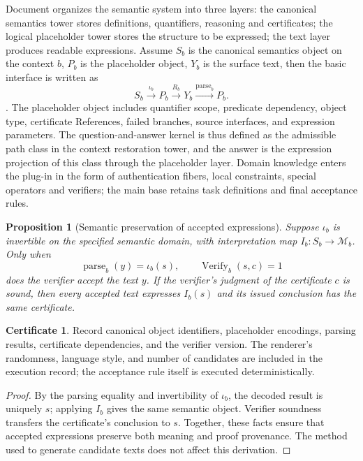 \documentclass[11pt,a4paper]{article}
\theoremstyle{plain}
\newtheorem{proposition}[theorem]{Proposition}
\theoremstyle{definition}
\newtheorem*{certificate}{Certificate}
\theoremstyle{remark}
\begin{document}
\begin{CJK*}
Document \cite{S20} organizes the semantic system into three layers: the canonical semantics tower stores definitions, quantifiers, reasoning and certificates; the logical placeholder tower stores the structure to be expressed; the text layer produces readable expressions. Assume $S_b$ is the canonical semantics object on the context $b$, $P_b$ is the placeholder object, $Y_b$ is the surface text, then the basic interface is written as \[
 S_b\xrightarrow{\iota_b}P_b\xrightarrow{R_b}Y_b
 \xrightarrow{\operatorname{parse}_b}P_b.
\]. The placeholder object includes quantifier scope, predicate dependency, object type, certificate References, failed branches, source interfaces, and expression parameters. The question-and-answer kernel is thus defined as the admissible path class in the context restoration tower, and the answer is the expression projection of this class through the placeholder layer. Domain knowledge enters the plug-in in the form of authentication fibers, local constraints, special operators and verifiers; the main base retains task definitions and final acceptance rules.

\begin{proposition} [Semantic preservation of accepted expressions]
\label{ss:render}
Suppose $\iota_b$ is invertible on the specified semantic domain, with interpretation map $I_b:S_b\to\mathcal M_b$. Only when
\[
 \operatorname{parse}_b(y)=\iota_b(s),\qquad
 \operatorname{Verify}_b(s,c)=1
\]
does the verifier accept the text $y$. If the verifier's judgment of the certificate $c$ is sound, then every accepted text expresses $I_b(s)$ and its issued conclusion has the same certificate.
\end{proposition}
\begin{certificate}
Record canonical object identifiers, placeholder encodings, parsing results, certificate dependencies, and the verifier version. The renderer's randomness, language style, and number of candidates are included in the execution record; the acceptance rule itself is executed deterministically.
\end{certificate}
\begin{proof}
By the parsing equality and invertibility of $\iota_b$, the decoded result is uniquely $s$; applying $I_b$ gives the same semantic object. Verifier soundness transfers the certificate's conclusion to $s$. Together, these facts ensure that accepted expressions preserve both meaning and proof provenance. The method used to generate candidate texts does not affect this derivation.
\end{proof}


\end{CJK*}
\end{document}
